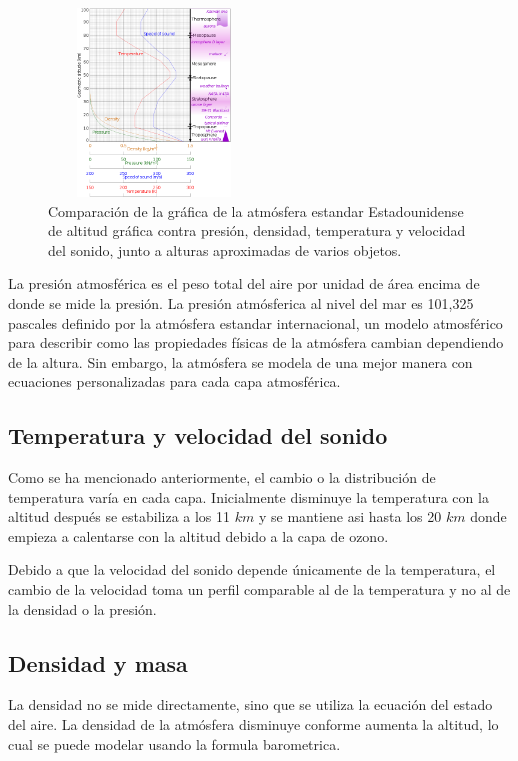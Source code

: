 \documentclass{article} %
\begin{document}
\begin{figure}
    \includegraphics[height=5cm,width=0.50\textwidth]{AtmosModel.png}
	\caption{Comparación de la gráfica de la atmósfera estandar Estadounidense de altitud gráfica contra presión, densidad, temperatura y velocidad del sonido, junto a alturas aproximadas de varios objetos.}
\end{figure}
La presión atmosférica es el peso total del aire por unidad de área encima de donde se mide la presión.
La presión atmósferica al nivel del mar es 101,325 pascales definido por la atmósfera estandar internacional, un modelo atmosférico para describir como las propiedades físicas de la atmósfera cambian dependiendo de la altura. Sin embargo, la atmósfera se modela de una mejor manera con ecuaciones personalizadas para cada capa atmosférica.

\subsection{Temperatura y velocidad del sonido}

Como se ha mencionado anteriormente, el cambio o la distribución de temperatura varía en cada capa. Inicialmente disminuye la temperatura con la altitud después se estabiliza a los 11 $km$ y se mantiene asi hasta los 20 $km$ donde empieza a calentarse con la altitud debido a la capa de ozono.

Debido a que la velocidad del sonido depende únicamente de la temperatura, el cambio de la velocidad toma un perfil comparable al de la temperatura y no al de la densidad o la presión.

\subsection{Densidad y masa}

La densidad no se mide directamente, sino que se utiliza la ecuación del estado del aire. La densidad de la atmósfera disminuye conforme aumenta la altitud, lo cual se puede modelar usando la formula barometrica.
\end{document}
